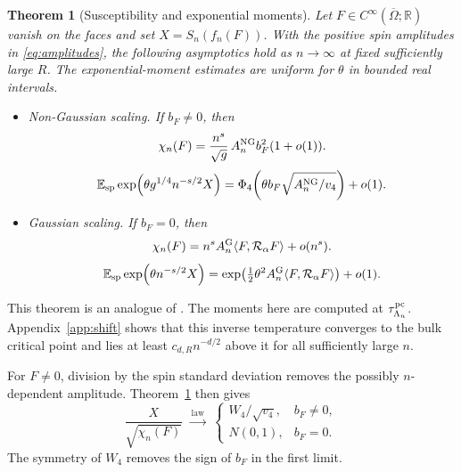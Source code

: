 \documentclass[11pt]{article}
\numberwithin{equation}{section}
\newtheorem{theorem}{Theorem}[section]
\newcommand{\E}{\mathbb E}
\newcommand{\R}{\mathbb R}
\newcommand{\ip}[2]{\langle #1,#2\rangle}
\newcommand{\Ga}{\mathcal R_\alpha}
\begin{document}
\begin{theorem}[Susceptibility and exponential moments] \label{thm:tests}
Let $F\in C^\infty(\overline\Omega;\R)$ vanish on the faces and set
$X=S_n(f_n(F))$. With the positive spin amplitudes in
\eqref{eq:amplitudes}, the following asymptotics hold as $n\to\infty$
at fixed sufficiently large $R$. The exponential-moment estimates
are uniform for $\theta$ in bounded real intervals.
\begin{itemize}
\item \emph{Non-Gaussian scaling.} If $b_F\ne0$, then
\begin{equation}
 \chi_n(F)=\frac{n^s}{\sqrt g}\, A_n^{\rm NG}b_F^2(1+o(1)).
 \label{eq:ng-susceptibility}
\end{equation}
\begin{equation}
 \E_{\rm sp}\exp\!\left(\theta g^{1/4}n^{-s/2}X\right)
   =\Phi_4\!\left(\theta b_F\sqrt{A_n^{\rm NG}/v_4}\right)+o(1).
 \label{eq:ng-laplace}
\end{equation}
\item \emph{Gaussian scaling.} If $b_F=0$, then
\begin{equation}
 \chi_n(F)=n^s A_n^{\rm G}\ip{F}{\Ga F}+o(n^s).
 \label{eq:g-susceptibility}
\end{equation}
\begin{equation}
 \E_{\rm sp}\exp\!\left(\theta n^{-s/2}X\right)
   =\exp\!\left(\tfrac12\theta^2 A_n^{\rm G}\ip{F}{\Ga F}\right)+o(1).
 \label{eq:g-laplace}
\end{equation}
\end{itemize}
\end{theorem}

This theorem is an analogue of \cite[Theorem~1.9]{park-torus}.
The moments here are computed at $\tau_{\Lambda_n}^{\rm pc}$.
Appendix~\ref{app:shift} shows that this inverse temperature converges to
the bulk critical point and lies at least $c_{d,R}n^{-d/2}$ above it
for all sufficiently large $n$.

For $F\ne0$, division by the spin standard deviation removes the
possibly $n$-dependent amplitude. Theorem~\ref{thm:tests} then gives
\begin{equation}
 \frac{X}{\sqrt{\chi_n(F)}}\ \xrightarrow{\ \mathrm{law}\ }\
 \begin{cases}
 W_4/\sqrt{v_4}, & b_F\ne0,\\
 N(0,1), & b_F=0 .
 \end{cases}
 \label{eq:standardized-laws}
\end{equation}
The symmetry of $W_4$ removes the sign of $b_F$ in the first limit.
\end{document}
